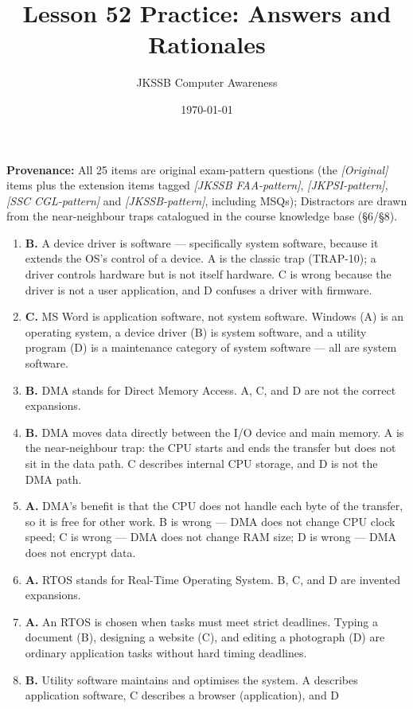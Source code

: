 \documentclass[11pt]{article}
\title{Lesson 52 Practice: Answers and Rationales}
\author{JKSSB Computer Awareness}
\date{\today}
\begin{document}
\maketitle
\noindent\textbf{Provenance:} All 25 items are original exam-pattern questions (the \textit{[Original]} items plus the extension items tagged \textit{[JKSSB FAA-pattern]}, \textit{[JKPSI-pattern]}, \textit{[SSC CGL-pattern]} and \textit{[JKSSB-pattern]}, including MSQs); Distractors are drawn from the near-neighbour traps catalogued in the course knowledge base (\S6/\S8).

\begin{enumerate}[label=\textbf{Q\arabic*.}, leftmargin=*]
\item \textbf{B.} A device driver is software --- specifically system
  software, because it extends the OS's control of a device. A is the
  classic trap (TRAP-10); a driver controls hardware but is not itself
  hardware. C is wrong because the driver is not a user application, and D
  confuses a driver with firmware.
\item \textbf{C.} MS Word is application software, not system software.
  Windows (A) is an operating system, a device driver (B) is system
  software, and a utility program (D) is a maintenance category of system
  software --- all are system software.
\item \textbf{B.} DMA stands for Direct Memory Access. A, C, and D are not
  the correct expansions.
\item \textbf{B.} DMA moves data directly between the I/O device and main
  memory. A is the near-neighbour trap: the CPU starts and ends the transfer
  but does not sit in the data path. C describes internal CPU storage, and D
  is not the DMA path.
\item \textbf{A.} DMA's benefit is that the CPU does not handle each byte of
  the transfer, so it is free for other work. B is wrong --- DMA does not
  change CPU clock speed; C is wrong --- DMA does not change RAM size; D is
  wrong --- DMA does not encrypt data.
\item \textbf{A.} RTOS stands for Real-Time Operating System. B, C, and D are
  invented expansions.
\item \textbf{A.} An RTOS is chosen when tasks must meet strict deadlines.
  Typing a document (B), designing a website (C), and editing a photograph
  (D) are ordinary application tasks without hard timing deadlines.
\item \textbf{B.} Utility software maintains and optimises the system. A
  describes application software, C describes a browser (application), and D

\end{enumerate}
\end{document}
